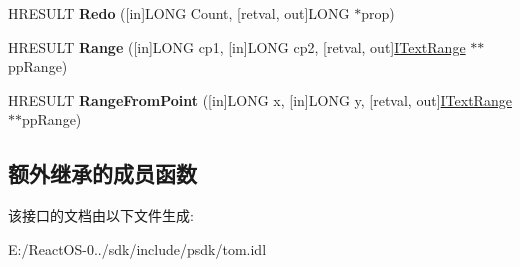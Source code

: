 \begin{DoxyCompactItemize}
H\+R\+E\+S\+U\+LT {\bfseries Redo} (\mbox{[}in\mbox{]}L\+O\+NG Count, \mbox{[}retval, out\mbox{]}L\+O\+NG $\ast$prop)
\item 
\mbox{\label{interface_i_text_document_a4d4bfe3a16f4d052d630cb144feeb2cd}} 
H\+R\+E\+S\+U\+LT {\bfseries Range} (\mbox{[}in\mbox{]}L\+O\+NG cp1, \mbox{[}in\mbox{]}L\+O\+NG cp2, \mbox{[}retval, out\mbox{]}\hyperlink{interface_i_text_range}{I\+Text\+Range} $\ast$$\ast$pp\+Range)
\item 
\mbox{\label{interface_i_text_document_a293f147bc5ddf6848d2713723c89c874}} 
H\+R\+E\+S\+U\+LT {\bfseries Range\+From\+Point} (\mbox{[}in\mbox{]}L\+O\+NG x, \mbox{[}in\mbox{]}L\+O\+NG y, \mbox{[}retval, out\mbox{]}\hyperlink{interface_i_text_range}{I\+Text\+Range} $\ast$$\ast$pp\+Range)
\end{DoxyCompactItemize}
\subsection*{额外继承的成员函数}


该接口的文档由以下文件生成\+:\begin{DoxyCompactItemize}
\item 
E\+:/\+React\+O\+S-\/0../sdk/include/psdk/tom.\+idl\end{DoxyCompactItemize}

